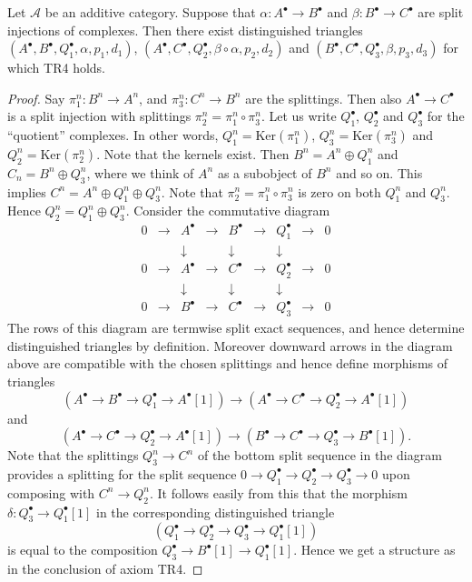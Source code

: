 \begin{lemma}
\label{lemma-two-split-injections}
Let $\mathcal{A}$ be an additive category. Suppose that
$\alpha : A^\bullet \to B^\bullet$ and $\beta : B^\bullet \to C^\bullet$
are split injections of complexes. Then there exist distinguished triangles
$(A^\bullet, B^\bullet, Q_1^\bullet, \alpha, p_1, d_1)$,
$(A^\bullet, C^\bullet, Q_2^\bullet, \beta \circ \alpha, p_2, d_2)$
and
$(B^\bullet, C^\bullet, Q_3^\bullet, \beta, p_3, d_3)$
for which TR4 holds.
\end{lemma}

\begin{proof}
Say $\pi_1^n : B^n \to A^n$, and $\pi_3^n : C^n \to B^n$ are the splittings.
Then also $A^\bullet \to C^\bullet$ is a split injection with splittings
$\pi_2^n = \pi_1^n \circ \pi_3^n$. Let us write $Q_1^\bullet$, $Q_2^\bullet$
and $Q_3^\bullet$ for the ``quotient'' complexes. In other words,
$Q_1^n = \text{Ker}(\pi_1^n)$, $Q_3^n = \text{Ker}(\pi_3^n)$ and
$Q_2^n = \text{Ker}(\pi_2^n)$. Note that the kernels exist. Then
$B^n = A^n \oplus Q_1^n$ and $C_n = B^n \oplus Q_3^n$, where we think of $A^n$
as a subobject of $B^n$ and so on. This implies
$C^n = A^n \oplus Q_1^n \oplus Q_3^n$. Note that
$\pi_2^n = \pi_1^n \circ \pi_3^n$ is zero on both $Q_1^n$ and $Q_3^n$. Hence
$Q_2^n = Q_1^n \oplus Q_3^n$. Consider the commutative diagram
$$
\begin{matrix}
0 & \to & A^\bullet & \to & B^\bullet & \to & Q_1^\bullet & \to & 0 \\
  &     & \downarrow&     & \downarrow&     & \downarrow  & \\
0 & \to & A^\bullet & \to & C^\bullet & \to & Q_2^\bullet & \to & 0 \\
  &     & \downarrow&     & \downarrow&     & \downarrow  & \\
0 & \to & B^\bullet & \to & C^\bullet & \to & Q_3^\bullet & \to & 0
\end{matrix}
$$
The rows of this diagram are termwise split exact sequences, and
hence determine distinguished triangles by
definition. Moreover downward arrows in the diagram above
are compatible with the chosen splittings and hence
define morphisms of triangles
$$
(A^\bullet \to B^\bullet \to Q_1^\bullet \to A^\bullet[1])
\longrightarrow
(A^\bullet \to C^\bullet \to Q_2^\bullet \to A^\bullet[1])
$$
and
$$
(A^\bullet \to C^\bullet \to Q_2^\bullet \to A^\bullet[1])
\longrightarrow
(B^\bullet \to C^\bullet \to Q_3^\bullet \to B^\bullet[1]).
$$
Note that the splittings $Q_3^n \to C^n$
of the bottom split sequence in the diagram provides a splitting
for the split sequence
$0 \to Q_1^\bullet \to Q_2^\bullet \to Q_3^\bullet \to 0$
upon composing with $C^n \to Q_2^n$. It follows easily from this
that the morphism $\delta : Q_3^\bullet \to Q_1^\bullet[1]$
in the corresponding distinguished triangle
$$
(Q_1^\bullet \to Q_2^\bullet \to Q_3^\bullet \to Q_1^\bullet[1])
$$
is equal to the composition $Q_3^\bullet \to B^\bullet[1] \to Q_1^\bullet[1]$.
Hence we get a structure as in the conclusion of axiom TR4.
\end{proof}

